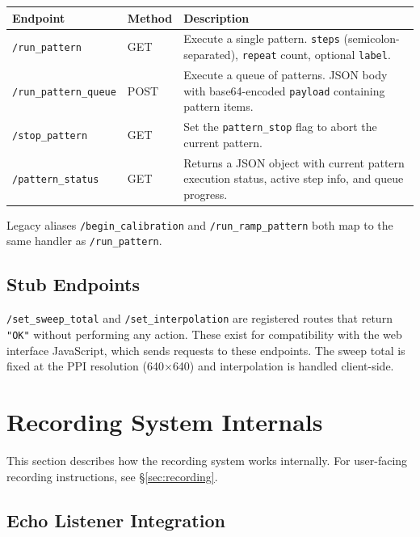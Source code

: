 \documentclass[11pt,letterpaper]{article}
\begin{document}
\begin{longtable}{l l p{7cm}}
\toprule
\textbf{Endpoint} & \textbf{Method} & \textbf{Description} \\
\midrule
\texttt{/run\_pattern} & GET & Execute a single pattern. \texttt{steps} (semicolon-separated), \texttt{repeat} count, optional \texttt{label}. \\
\texttt{/run\_pattern\_queue} & POST & Execute a queue of patterns. JSON body with base64-encoded \texttt{payload} containing pattern items. \\
\texttt{/stop\_pattern} & GET & Set the \texttt{pattern\_stop} flag to abort the current pattern. \\
\texttt{/pattern\_status} & GET & Returns a JSON object with current pattern execution status, active step info, and queue progress. \\
\bottomrule
\end{longtable}

Legacy aliases \texttt{/begin\_calibration} and \texttt{/run\_ramp\_pattern} both map to the same handler as \texttt{/run\_pattern}.

\subsection{Stub Endpoints}
\label{subsec:api-stubs}

\texttt{/set\_sweep\_total} and \texttt{/set\_interpolation} are registered routes that return \texttt{"OK"} without performing any action. These exist for compatibility with the web interface JavaScript, which sends requests to these endpoints. The sweep total is fixed at the PPI resolution (640$\times$640) and interpolation is handled client-side.


\newpage
\section{Recording System Internals}
\label{sec:recording-internals}

This section describes how the recording system works internally. For user-facing recording instructions, see \S\ref{sec:recording}.

\subsection{Echo Listener Integration}
\label{subsec:recording-echo-listener}
\end{document}
